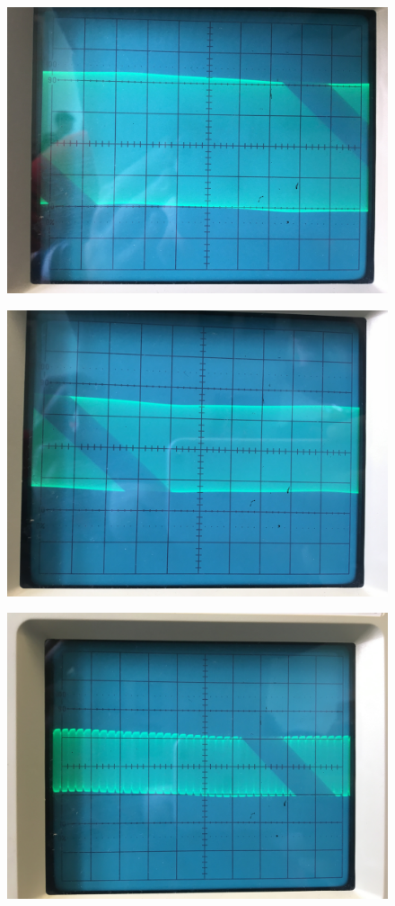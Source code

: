 \documentclass[a4paper,14pt]{extarticle}
\begin{document}
\begin{enumerate}
\begin{figure}[H]
 	\includegraphics[width=0.8\linewidth]{photo/IMG_3224}
 \end{figure}
\begin{figure}[H]
	\centering
	\includegraphics[width=0.8\linewidth]{photo/IMG_3226}
\end{figure}
\begin{figure}[H]
	\centering
	\includegraphics[width=0.8\linewidth]{photo/IMG_3228}

\end{figure}
\end{enumerate}
\end{document}

